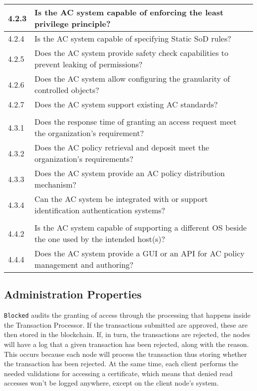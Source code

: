 {\begin{table}[htb]
\begin{tabular}{l|l}
            4.2.3 & \llap{\textbullet} Is the AC system capable of enforcing the least privilege principle? \\ \hline
            4.2.4 & \llap{\textbullet} Is the AC system capable of specifying Static SoD rules? \\ \hline
            4.2.5 & \llap{\textbullet} Does the AC system provide safety check capabilities to prevent leaking of permissions? \\ \hline
            4.2.6 & \llap{\textbullet} Does the AC system allow configuring the granularity of controlled objects? \\ \hline
            4.2.7 & \llap{\textbullet} Does the AC system support existing AC standards? \\ 
            \hline \rowcolor{lightgray} \multicolumn{2}{l}{Performance Properties} \\ \hline
            4.3.1 & \llap{\textbullet} Does the response time of granting an access request meet the organization’s requirement? \\ \hline
            4.3.2 & \llap{\textbullet} Does the AC policy retrieval and deposit meet the organization’s requirements? \\ \hline
            4.3.3 & \llap{\textbullet} Does the AC system provide an AC policy distribution mechanism? \\ \hline
            4.3.4 & \llap{\textbullet} Can the AC system be integrated with or support identification authentication systems? \\
            \hline \rowcolor{lightgray} \multicolumn{2}{l}{Support Properties} \\ \hline
            4.4.2 & \llap{\textbullet} Is the AC system capable of supporting a different OS beside the one used by the intended host(s)? \\ \hline
            4.4.4 & \llap{\textbullet} Does the AC system provide a GUI or an API for AC policy management and authoring? \\
            \hline
        \end{tabular}
    \end{table}
}

\subsection{Administration Properties} 

\texttt{Blocked} audits the granting of access through the processing that happens inside the Transaction Processor. If the transactions submitted are approved, these are then stored in the blockchain. If, in turn, the transactions are rejected, the nodes will have a log that a given transaction has been rejected, along with the reason. This occurs because each node will process the transaction thus storing whether the transaction has been rejected. At the same time, each client performs the needed validations for accessing a certificate, which means that denied read accesses won't be logged anywhere, except on the client node's system. 

